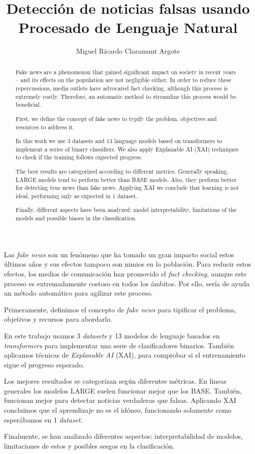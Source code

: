 \documentclass[twoside,spanish,a4paper,12pt]{tfg}
\title{Detección de noticias falsas usando Procesado de Lenguaje Natural}
\author{Miguel Ricardo Claramunt Argote}
\begin{document}
\portada
\cleardoublepage
\contraportada
\cleardoublepage
\declaracion
\cleardoublepage


\begin{resumen}
    Las \textit{fake news} son un fenómeno que ha tomado un gran impacto social estos últimos años y sus efectos tampoco son nimios en la población. Para reducir estos efectos, los medios de comunicación han promovido el \textit{fact checking}, aunque este proceso es extremadamente costoso en todos los ámbitos. Por ello, sería de ayuda un método automático para agilizar este proceso. 
    
    Primeramente, definimos el concepto de \textit{fake news} para tipificar el problema, objetivos y recursos para abordarlo.
    
    En este trabajo usamos 3 \textit{datasets} y 13 modelos de lenguaje basados en \textit{transformers} para implementar una serie de clasificadores binarios. También aplicamos técnicas de \textit{Explanable AI} (XAI), para comprobar si el entrenamiento sigue el progreso esperado. 
    
    Los mejores resultados se categorizan según diferentes métricas. En líneas generales los modelos LARGE suelen funcionar mejor que los BASE. También, funcionan mejor para detectar noticias verdaderas que falsas. Aplicando XAI concluimos que el aprendizaje no es el idóneo, funcionando solamente como esperábamos en 1 \textit{dataset}. 
    
    Finalmente, se han analizado diferentes aspectos: interpretabilidad de modelos, limitaciones de estos y posibles sesgos en la clasificación.
\end{resumen}
\cleardoublepage

\begin{abstract}
    Fake news are a phenomenon that gained significant impact on society in recent years -- and its effects on the population are not negligible either. In order to reduce these repercussions, media outlets have advocated fact checking, although this process is extremely costly. Therefore, an automatic method to streamline this process would be beneficial.
    
    First, we define the concept of fake news to typify the problem, objectives and resources to address it.
    
    In this work we use 3 datasets and 13 language models based on transformers to implement a series of binary classifiers. We also apply Explanable AI (XAI) techniques to check if the training follows expected progress.
    
    The best results are categorized according to different metrics. Generally speaking, LARGE models tend to perform better than BASE models. Also, they perform better for detecting true news than fake news. Applying XAI we conclude that learning is not ideal, performing only as expected in 1 dataset.
    
    Finally, different aspects have been analyzed: model interpretability, limitations of the models and possible biases in the classification.
\end{abstract}
\cleardoublepage
\end{document}
